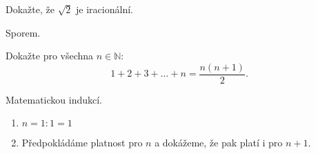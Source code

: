 \begin{priklad}
Dokažte, že $\sqrt{2} $ je iracionální.
\end{priklad}

\begin{reseni}
Sporem.
\end{reseni}

\begin{priklad}
Dokažte pro všechna $n\in \mathbb N: $
$$1+2+3+\dots+n=\frac{n(n+1)}{2}.$$
\end{priklad}

\begin{reseni}
Matematickou indukcí.
\begin{enumerate}[1.]
\item $n=1: 1=1$
\item Předpokládáme platnost pro $n$ a dokážeme, že pak platí i pro $n+1$.
\end{enumerate}
\end{reseni}
